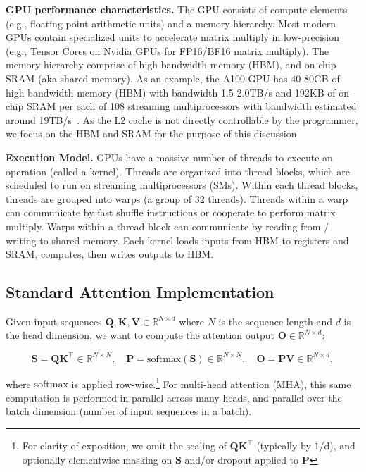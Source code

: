 \textbf{GPU performance characteristics.} The GPU consists of compute elements (e.g., floating point arithmetic units) and a memory hierarchy. Most modern GPUs contain specialized units to accelerate matrix multiply in low-precision (e.g., Tensor Cores on Nvidia GPUs for FP16/BF16 matrix multiply). The memory hierarchy comprise of high bandwidth memory (HBM), and on-chip SRAM (aka shared memory). As an example, the A100 GPU has 40-80GB of high bandwidth memory (HBM) with bandwidth 1.5-2.0TB/s and 192KB of on-chip SRAM per each of 108 streaming multiprocessors with bandwidth estimated around 19TB/s~\citep{jia2018dissecting,
  jia2021dissecting}.
As the L2 cache is not directly controllable by the programmer, we focus on the HBM and SRAM for the purpose of this discussion.

\textbf{Execution Model.} GPUs have a massive number of threads to execute an operation (called a kernel). Threads are organized into thread blocks, which are scheduled to run on streaming multiprocessors (SMs). Within each thread blocks, threads are grouped into warps (a group of 32 threads). Threads within a warp can communicate by fast shuffle instructions or cooperate to perform matrix multiply. Warps within a thread block can communicate by reading from / writing to shared memory. Each kernel loads inputs from HBM to registers and SRAM, computes, then writes outputs to HBM.

\subsection{Standard Attention Implementation}
\label{subsec:standard_attn}

Given input sequences $\mathbf{Q}, \mathbf{K}, \mathbf{V} \in \mathbb{R}^{N \times d}$ where $N$ is the sequence length and $d$ is the head dimension, we want to compute the attention output $\mathbf{O} \in \mathbb{R}^{N \times d}$:

\begin{equation*}
  \mathbf{S} = \mathbf{Q} \mathbf{K}^\top \in \mathbb{R}^{N \times N}, \quad \mathbf{P} = \mathrm{softmax}(\mathbf{S}) \in \mathbb{R}^{N \times N}, \quad \mathbf{O} = \mathbf{P}\mathbf{V} \in \mathbb{R}^{N \times d},
\end{equation*}

where $\mathrm{softmax}$ is applied row-wise.\footnote{For clarity of exposition, we omit the scaling of $\mathbf{Q} \mathbf{K}^\top$ (typically by $1/\mathrm{d}$), and optionally elementwise masking on $\mathbf{S}$ and/or dropout applied to $\mathbf{P}$} For multi-head attention (MHA), this same computation is performed in parallel across many heads, and parallel over the batch dimension (number of input sequences in a batch).

